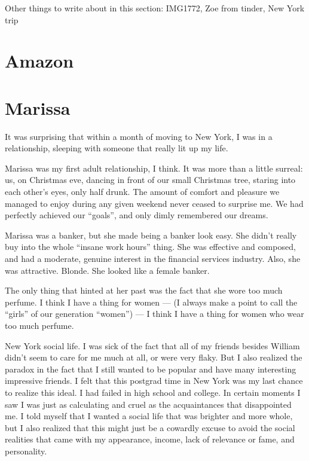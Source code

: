 \documentclass[12pt]{article}
\begin{document}
Other things to write about in this section: IMG1772, Zoe from tinder, New York
trip

\section{Amazon}



\section{Marissa}
It was surprising that within a month of moving to New York, I was in a
relationship, sleeping with someone that really lit up my life.

Marissa was my first adult relationship, I think.  It was more than a little
surreal: us, on Christmas eve, dancing in front of our small Christmas tree,
staring into each other's eyes, only half drunk.  The amount of comfort and
pleasure we managed to enjoy during any given weekend never ceased to surprise
me.  We had perfectly achieved our ``goals'', and only dimly remembered our
dreams.

Marissa was a banker, but she made being a banker look easy.  She didn't really
buy into the whole ``insane work hours'' thing.  She was effective and composed,
and had a moderate, genuine interest in the financial services industry.  Also,
she was attractive.  Blonde.  She looked like a female banker. 

The only thing that hinted at her past was the fact that she wore too much
perfume.  I think I have a thing for women --- (I always make a point to call
the ``girls'' of our generation ``women'') --- I think I have a thing for women
who wear too much perfume.

New York social life.  I was sick of the fact that all of my friends besides
William didn't seem to care for me much at all, or were very flaky.  But I also
realized the paradox in the fact that I still wanted to be popular and have many
interesting impressive friends.  I felt that this postgrad time in New York was
my last chance to realize this ideal.  I had failed in high school and college.
In certain moments I saw I was just as calculating and cruel as the
acquaintances that disappointed me.  I told myself that I wanted a social life
that was brighter and more whole, but I also realized that this might just be a
cowardly excuse to avoid the social realities that came with my appearance,
income, lack of relevance or fame, and personality.
\end{document}
